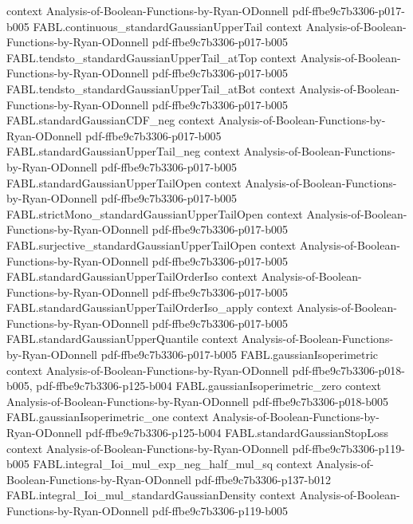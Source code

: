 \begin{theorem}
  {context}
  {Analysis-of-Boolean-Functions-by-Ryan-ODonnell}
  {pdf-ffbe9c7b3306-p017-b005}
\proofstep
  {FABL.continuous_standardGaussianUpperTail}
  {context}
  {Analysis-of-Boolean-Functions-by-Ryan-ODonnell}
  {pdf-ffbe9c7b3306-p017-b005}
\proofstep
  {FABL.tendsto_standardGaussianUpperTail_atTop}
  {context}
  {Analysis-of-Boolean-Functions-by-Ryan-ODonnell}
  {pdf-ffbe9c7b3306-p017-b005}
\proofstep
  {FABL.tendsto_standardGaussianUpperTail_atBot}
  {context}
  {Analysis-of-Boolean-Functions-by-Ryan-ODonnell}
  {pdf-ffbe9c7b3306-p017-b005}
\proofstep
  {FABL.standardGaussianCDF_neg}
  {context}
  {Analysis-of-Boolean-Functions-by-Ryan-ODonnell}
  {pdf-ffbe9c7b3306-p017-b005}
\proofstep
  {FABL.standardGaussianUpperTail_neg}
  {context}
  {Analysis-of-Boolean-Functions-by-Ryan-ODonnell}
  {pdf-ffbe9c7b3306-p017-b005}
\proofstep
  {FABL.standardGaussianUpperTailOpen}
  {context}
  {Analysis-of-Boolean-Functions-by-Ryan-ODonnell}
  {pdf-ffbe9c7b3306-p017-b005}
\proofstep
  {FABL.strictMono_standardGaussianUpperTailOpen}
  {context}
  {Analysis-of-Boolean-Functions-by-Ryan-ODonnell}
  {pdf-ffbe9c7b3306-p017-b005}
\proofstep
  {FABL.surjective_standardGaussianUpperTailOpen}
  {context}
  {Analysis-of-Boolean-Functions-by-Ryan-ODonnell}
  {pdf-ffbe9c7b3306-p017-b005}
\proofstep
  {FABL.standardGaussianUpperTailOrderIso}
  {context}
  {Analysis-of-Boolean-Functions-by-Ryan-ODonnell}
  {pdf-ffbe9c7b3306-p017-b005}
\proofstep
  {FABL.standardGaussianUpperTailOrderIso_apply}
  {context}
  {Analysis-of-Boolean-Functions-by-Ryan-ODonnell}
  {pdf-ffbe9c7b3306-p017-b005}
\proofstep
  {FABL.standardGaussianUpperQuantile}
  {context}
  {Analysis-of-Boolean-Functions-by-Ryan-ODonnell}
  {pdf-ffbe9c7b3306-p017-b005}
\proofstep
  {FABL.gaussianIsoperimetric}
  {context}
  {Analysis-of-Boolean-Functions-by-Ryan-ODonnell}
  {pdf-ffbe9c7b3306-p018-b005,
    pdf-ffbe9c7b3306-p125-b004}
\proofstep
  {FABL.gaussianIsoperimetric_zero}
  {context}
  {Analysis-of-Boolean-Functions-by-Ryan-ODonnell}
  {pdf-ffbe9c7b3306-p018-b005}
\proofstep
  {FABL.gaussianIsoperimetric_one}
  {context}
  {Analysis-of-Boolean-Functions-by-Ryan-ODonnell}
  {pdf-ffbe9c7b3306-p125-b004}
\proofstep
  {FABL.standardGaussianStopLoss}
  {context}
  {Analysis-of-Boolean-Functions-by-Ryan-ODonnell}
  {pdf-ffbe9c7b3306-p119-b005}
\proofstep
  {FABL.integral_Ioi_mul_exp_neg_half_mul_sq}
  {context}
  {Analysis-of-Boolean-Functions-by-Ryan-ODonnell}
  {pdf-ffbe9c7b3306-p137-b012}
\proofstep
  {FABL.integral_Ioi_mul_standardGaussianDensity}
  {context}
  {Analysis-of-Boolean-Functions-by-Ryan-ODonnell}
  {pdf-ffbe9c7b3306-p119-b005}

\end{theorem}
